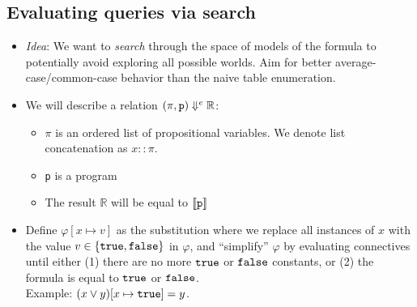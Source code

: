 \documentclass{tufte-handout}
\begin{document}
\subsection{Evaluating queries via search}
\begin{itemize}
    \item \emph{Idea}: We want to \emph{search} through the space of models of
    the formula to potentially avoid exploring all possible worlds. Aim for better 
    average-case/common-case behavior than the naive table enumeration.
    

    \item We will describe a relation $(\pi, \texttt{p}) \Downarrow^e \mathbb{R}$:
    \begin{itemize}[noitemsep]
        \item $\pi$ is an ordered list of propositional variables. We denote 
        list concatenation as $x::\pi$. 
        \item \texttt{p} is a \prop{} program
        \item The result $\mathbb{R}$ will be equal to $\llbracket {\texttt{p}} \rrbracket$
    \end{itemize}

    \item Define $\varphi[x \mapsto v]$ as the substitution where we replace all
    instances of $x$ with the value $v \in \{\texttt{true}, \texttt{false}\}$ in $\varphi$, and
    ``simplify'' $\varphi$ by evaluating connectives until either (1) there are no more 
    $\texttt{true}$ or $\texttt{false}$ constants, or (2) the formula is equal to $\texttt{true}$ or $\texttt{false}$. 
    \\
    Example: $(x \lor y)[x \mapsto \texttt{true}] = y$.


\end{itemize}
\end{document}
